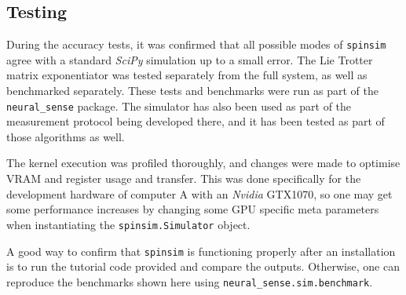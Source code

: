 \documentclass{jors}
\begin{document}

	\subsection*{Testing}
		During the accuracy tests, it was confirmed that all possible modes of \texttt{spinsim} agree with a standard \emph{SciPy} simulation up to a small error. The Lie Trotter matrix exponentiator was tested separately from the full system, as well as benchmarked separately. These tests and benchmarks were run as part of the \texttt{neural\_sense} package. The simulator has also been used as part of the measurement protocol being developed there, and it has been tested as part of those algorithms as well.

		The kernel execution was profiled thoroughly, and changes were made to optimise VRAM and register usage and transfer. This was done specifically for the development hardware of computer A with an \emph{Nvidia} GTX1070, so one may get some performance increases by changing some GPU specific meta parameters when instantiating the \texttt{spinsim.Simulator} object.

		A good way to confirm that \texttt{spinsim} is functioning properly after an installation is to run the tutorial code provided and compare the outputs. Otherwise, one can reproduce the benchmarks shown here using \texttt{neural\_sense.sim.benchmark}.
\end{document}
